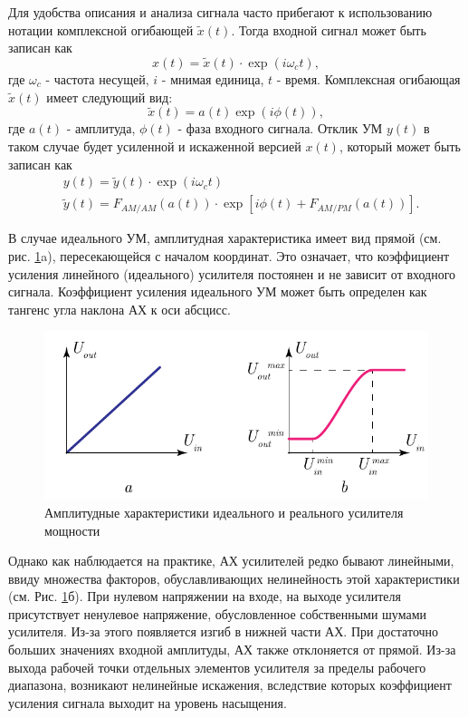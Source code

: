 Для удобства описания и анализа сигнала часто прибегают к использованию
нотации комплексной огибающей $\tilde{x}(t)$. Тогда входной сигнал может быть
записан как 
\begin{equation}
    x(t) = \tilde{x}(t) \cdot \exp(i \omega_c t),
\end{equation}
где $\omega_c$ - частота несущей, $i$ - мнимая единица, $t$ - время.
Комплексная огибающая $\tilde{x}(t)$ имеет следующий вид:
\begin{equation}
    \tilde{x}(t) = a(t) \exp(i\phi(t)),
\end{equation}
где $a(t)$ - амплитуда, $\phi(t)$ - фаза входного сигнала. Отклик УМ $y(t)$
в таком случае будет усиленной и искаженной версией $x(t)$, который может
быть записан как
\begin{equation}
    \begin{aligned}
        &y(t) = \tilde{y}(t) \cdot \exp(i \omega_c t)\\
        &\tilde{y}(t) = F_{AM/AM}(a(t)) \cdot \exp[i \phi(t) + F_{AM/PM}(a(t))].
    \end{aligned}
    \label{eq:pa_distortion}
\end{equation}

В случае идеального УМ, амплитудная характеристика имеет вид прямой (см.
рис. \ref{fig:1.1}a), пересекающейся с началом координат. Это означает, что
коэффициент усиления линейного (идеального) усилителя постоянен и не
зависит от входного сигнала. Коэффициент усиления идеального УМ может быть
определен как тангенс угла наклона АХ к оси абсцисс.

\begin{figure}[h!]
    \centering
    \includegraphics[width=0.8\linewidth]{figs/amp_char.pdf}
    \caption{Амплитудные характеристики идеального и реального усилителя мощности}
    \label{fig:1.1}
\end{figure}

Однако как наблюдается на практике, АХ усилителей редко бывают линейными,
ввиду множества факторов, обуславливающих нелинейность этой характеристики
(см. Рис. \ref{fig:1.1}б). При нулевом напряжении на входе, на выходе
усилителя присутствует ненулевое напряжение, обусловленное собственными
шумами усилителя. Из-за этого появляется изгиб в нижней части АХ. При
достаточно больших значениях входной амплитуды, АХ также отклоняется от
прямой. Из-за выхода рабочей точки отдельных элементов усилителя за пределы
рабочего диапазона, возникают нелинейные искажения, вследствие которых
коэффициент усиления сигнала выходит на уровень насыщения.

